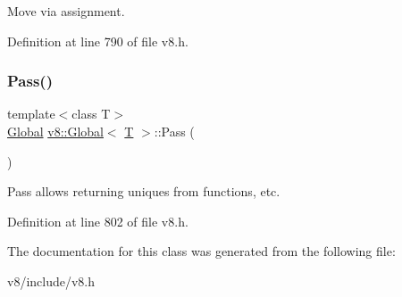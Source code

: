 Move via assignment. 

Definition at line 790 of file v8.\+h.

\mbox{\label{classv8_1_1Global_a914903149cc752468d4a3a11b6089c7e}} 
\subsubsection{\texorpdfstring{Pass()}{Pass()}}
{\footnotesize\ttfamily template$<$class T$>$ \\
\mbox{\hyperlink{classv8_1_1Global}{Global}} \mbox{\hyperlink{classv8_1_1Global}{v8\+::\+Global}}$<$ \mbox{\hyperlink{classv8_1_1internal_1_1torque_1_1T}{T}} $>$\+::Pass (\begin{DoxyParamCaption}{ }\end{DoxyParamCaption})\hspace{0.3cm}{\ttfamily [inline]}}

Pass allows returning uniques from functions, etc. 

Definition at line 802 of file v8.\+h.



The documentation for this class was generated from the following file\+:\begin{DoxyCompactItemize}
\item 
v8/include/v8.\+h\end{DoxyCompactItemize}
